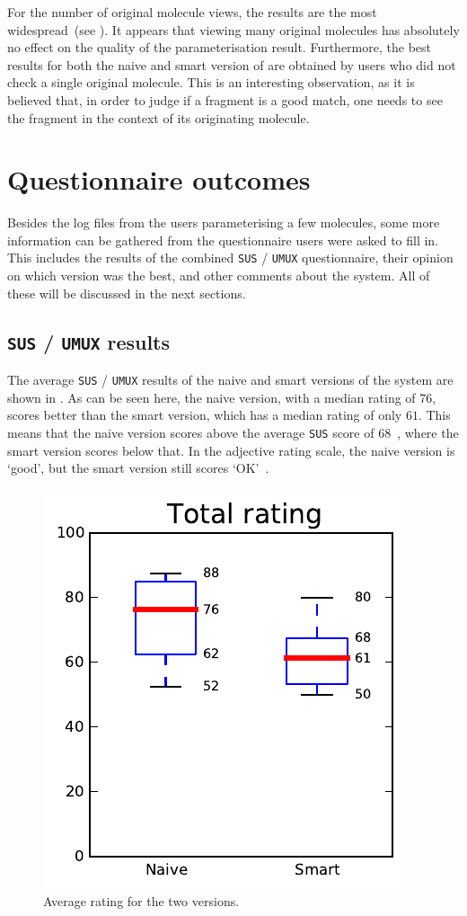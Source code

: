 For the number of original molecule views, the results are the most widespread~(see ). It appears that viewing many original molecules has absolutely no effect on the quality of the parameterisation result. Furthermore, the best results for both the naive and smart version of \oframp{} are obtained by users who did not check a single original molecule. This is an interesting observation, as it is believed that, in order to judge if a fragment is a good match, one needs to see the fragment in the context of its originating molecule.


\section{Questionnaire outcomes}
Besides the log files from the users parameterising a few molecules, some more information can be gathered from the questionnaire users were asked to fill in. This includes the results of the combined \verb|SUS| / \verb|UMUX| questionnaire, their opinion on which version was the best, and other comments about the system. All of these will be discussed in the next sections.

\subsection{\texttt{SUS} / \texttt{UMUX} results}
The average \verb|SUS| / \verb|UMUX| results of the naive and smart versions of the system are shown in . As can be seen here, the naive version, with a median rating of $76$, scores better than the smart version, which has a median rating of only $61$. This means that the naive version scores above the average \verb|SUS| score of 68~\cite{sauro2011measuring}, where the smart version scores below that. In the adjective rating scale, the naive version is `good', but the smart version still scores `OK'~\cite{bangor2009determining}.

\begin{figure}[h!]
\center
\includegraphics[width=.32\textwidth]{img/graphs/4a_10.pdf}
\caption{Average rating for the two versions.}
\end{figure}

